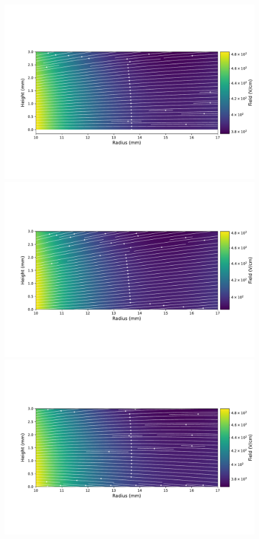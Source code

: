 \begin{figure}
\centering
\includegraphics[trim={1.5cm 3.5cm 0.2cm 4.6cm},clip,width=0.99\linewidth]{ch3/figs/elect_field_lines_surface_ponama_1_sc_0.pdf}
\includegraphics[trim={1.5cm 3.5cm 0.2cm 4.6cm},clip,width=0.99\linewidth]{ch3/figs/elect_field_lines_surface_ponama_1_sc_-0.5.pdf}
\includegraphics[trim={1.5cm 3.5cm 0.2cm 4.6cm},clip,width=0.99\linewidth]{ch3/figs/elect_field_lines_surface_ponama_1_sc_0.5.pdf}

\end{figure}

